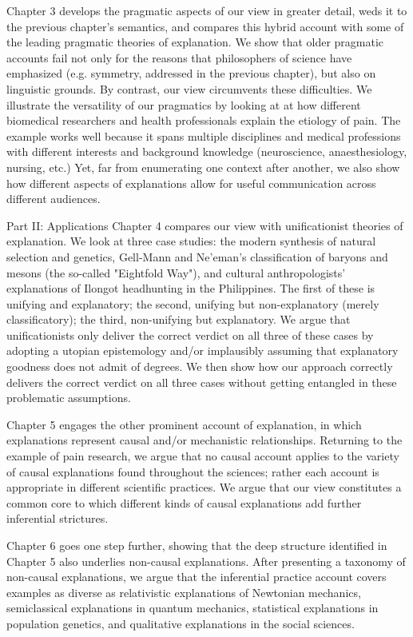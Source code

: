 \documentclass{article}[11pt]
\begin{document}
Chapter 3 develops the pragmatic aspects of our view in greater detail, weds it to the previous chapter's semantics, and compares this hybrid account with some of the leading pragmatic theories of explanation. We show that older pragmatic accounts fail not only for the reasons that philosophers of science have emphasized (e.g. symmetry, addressed in the previous chapter), but also on linguistic grounds. By contrast, our view circumvents these difficulties. We illustrate the versatility of our pragmatics by looking at  at how different biomedical researchers and health professionals explain the etiology of pain. The example works well because it spans multiple disciplines and medical professions with different interests and background knowledge (neuroscience, anaesthesiology, nursing, etc.) Yet, far from enumerating one context after another, we also show how different aspects of explanations allow for useful communication across different audiences.

Part II: Applications
Chapter 4 compares our view with unificationist theories of explanation.  We look at three case studies: the modern synthesis of natural selection and genetics, Gell-Mann and Ne'eman's classification of baryons and mesons (the so-called "Eightfold Way"), and cultural anthropologists' explanations of Ilongot headhunting in the Philippines. The first of these is unifying and explanatory; the second, unifying but non-explanatory (merely classificatory); the third, non-unifying but explanatory. We argue that unificationists only deliver the correct verdict on all three of these cases by adopting a utopian epistemology and/or implausibly assuming that explanatory goodness does not admit of degrees. We then show how our approach correctly delivers the correct verdict on all three cases without getting entangled in these problematic assumptions. 

Chapter 5 engages the other prominent account of explanation, in which explanations represent causal and/or mechanistic relationships.  Returning to the example of pain research, we argue that no causal account applies to the variety of causal explanations found throughout the sciences; rather each account is appropriate in different scientific practices. We argue that our view constitutes a common core to which different kinds of causal explanations add further inferential strictures. 

Chapter 6 goes one step further, showing that the deep structure identified in Chapter 5 also underlies non-causal explanations. After presenting a taxonomy of non-causal explanations, we argue that the inferential practice account covers examples as diverse as relativistic explanations of Newtonian mechanics, semiclassical explanations in quantum mechanics, statistical explanations in population genetics, and qualitative explanations in the social sciences.
\end{document}
